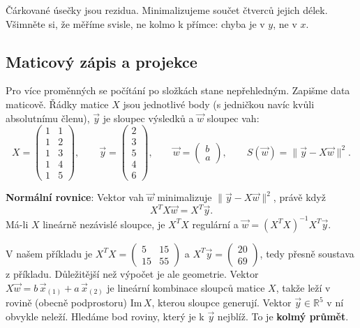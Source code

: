 Čárkované úsečky jsou rezidua. Minimalizujeme součet čtverců jejich délek. Všimněte si, že měříme svisle, ne kolmo k přímce: chyba je v $y$, ne v $x$.

\subsection{Maticový zápis a projekce}

Pro více proměnných se počítání po složkách stane nepřehledným. Zapišme data maticově. Řádky matice $X$ jsou jednotlivé body (s jedničkou navíc kvůli absolutnímu členu), $\vec{y}$ je sloupec výsledků a $\vec{w}$ sloupec vah:
\begin{equation*}
  X = \begin{pmatrix} 1 & 1\\ 1 & 2\\ 1 & 3\\ 1 & 4\\ 1 & 5\end{pmatrix},\qquad\vec{y} = \begin{pmatrix} 2\\ 3\\ 5\\ 4\\ 6\end{pmatrix},\qquad\vec{w} = \begin{pmatrix} b\\ a\end{pmatrix},\qquad S(\vec{w}) = \|\vec{y} - X\vec{w}\|^2.
\end{equation*}

\begin{definitionbox}
  \textbf{Normální rovnice}: Vektor vah $\vec{w}$ minimalizuje $\|\vec{y} - X\vec{w}\|^2$, právě když
  \begin{equation*}
    X^TX\vec{w} = X^T\vec{y}.
  \end{equation*}
  Má-li $X$ lineárně nezávislé sloupce, je $X^TX$ regulární a $\vec{w} = {(X^TX)}^{-1}X^T\vec{y}$.
\end{definitionbox}

V našem příkladu je $X^TX = \begin{pmatrix} 5 & 15\\ 15 & 55\end{pmatrix}$ a $X^T\vec{y} = \begin{pmatrix} 20\\ 69\end{pmatrix}$, tedy přesně soustava z příkladu. Důležitější než výpočet je ale geometrie. Vektor $X\vec{w} = b\,\vec{x}_{(1)} + a\,\vec{x}_{(2)}$ je lineární kombinace sloupců matice $X$, takže leží v rovině (obecně podprostoru) $\mathrm{Im}\,X$, kterou sloupce generují. Vektor $\vec{y}\in\mathbb{R}^5$ v ní obvykle neleží. Hledáme bod roviny, který je k $\vec{y}$ nejblíž. To je \textbf{kolmý průmět}.

